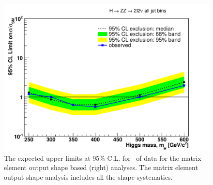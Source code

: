 \begin{figure}[!htbp]
\begin{center}
   \includegraphics[width=1.0\textwidth]{figures/limits_meshape_5fb.pdf}
   \caption{ The expected upper limits at 95\% C.L. for \intlumi\ of data for the matrix element output shape based (right) analyses. 
	The matrix element output shape analysis includes all the shape systematics. }
   \label{fig:limits_meshape_5fb}
\end{center}
\end{figure}
